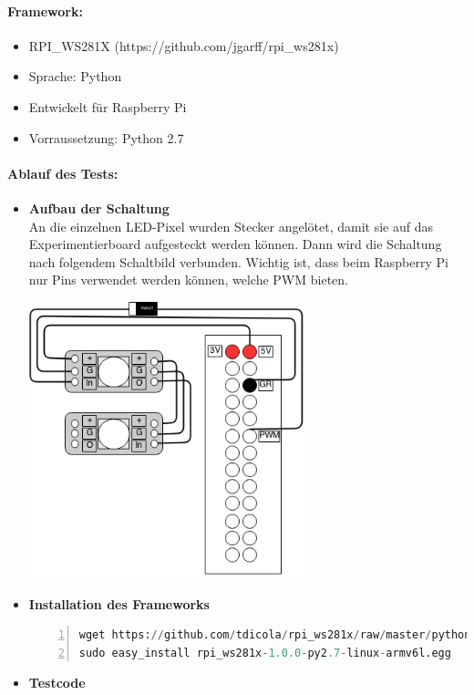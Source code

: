 \paragraph{Framework:}
	\begin{itemize}
	\item RPI\_WS281X (https://github.com/jgarff/rpi\_ws281x)
	\item Sprache: Python
	\item Entwickelt für Raspberry Pi
	\item Vorraussetzung: Python 2.7
	\end{itemize}
\paragraph{Ablauf des Tests:}
\begin{itemize}

\item \textbf{Aufbau der Schaltung}\\
An die einzelnen LED-Pixel wurden Stecker angelötet, damit sie auf das Experimentierboard aufgesteckt werden können. Dann wird die Schaltung nach folgendem Schaltbild verbunden. Wichtig ist, dass beim Raspberry Pi nur Pins verwendet werden können, welche PWM bieten. \\
\begin{minipage}{\linewidth}
            \centering
            \includegraphics[width=8cm]{./data/TestSchaltungLED.png}
        \end{minipage}
\item \textbf{Installation des Frameworks} 
\begin{lstlisting}[caption = Installation Framework ws281x, language=Python, frame=single, breaklines=true,columns=fullflexible, commentstyle=\color{gray}\upshape, captionpos=b, numbers = left]
wget https://github.com/tdicola/rpi_ws281x/raw/master/python/dist/rpi_ws281x-1.0.0-py2.7-linux-armv6l.egg 
sudo easy_install rpi_ws281x-1.0.0-py2.7-linux-armv6l.egg
\end{lstlisting}
\item \textbf{Testcode}


\end{itemize}
